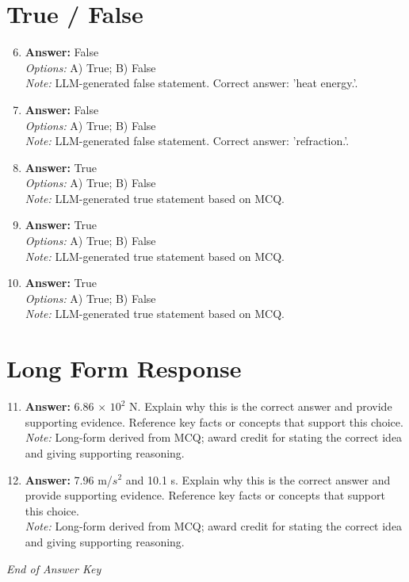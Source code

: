 \documentclass[12pt]{article}
\begin{document}
\section*{True / False}
\begin{enumerate}[label=\arabic*.]
\setcounter{enumi}{5}
\item \textbf{Answer:} False
\\ \textit{Options:} A) True; B) False
\\ \textit{Note:} LLM-generated false statement. Correct answer: 'heat energy.'.
\item \textbf{Answer:} False
\\ \textit{Options:} A) True; B) False
\\ \textit{Note:} LLM-generated false statement. Correct answer: 'refraction.'.
\item \textbf{Answer:} True
\\ \textit{Options:} A) True; B) False
\\ \textit{Note:} LLM-generated true statement based on MCQ.
\item \textbf{Answer:} True
\\ \textit{Options:} A) True; B) False
\\ \textit{Note:} LLM-generated true statement based on MCQ.
\item \textbf{Answer:} True
\\ \textit{Options:} A) True; B) False
\\ \textit{Note:} LLM-generated true statement based on MCQ.
\end{enumerate}

\section*{Long Form Response}
\begin{enumerate}[label=\arabic*.]
\setcounter{enumi}{10}
\item \textbf{Answer:} 6.86 \ensuremath{\times} $10^2$ N. Explain why this is the correct answer and provide supporting evidence. Reference key facts or concepts that support this choice.
\\ \textit{Note:} Long-form derived from MCQ; award credit for stating the correct idea and giving supporting reasoning.
\item \textbf{Answer:} 7.96 m/$s^2$ and 10.1 s. Explain why this is the correct answer and provide supporting evidence. Reference key facts or concepts that support this choice.
\\ \textit{Note:} Long-form derived from MCQ; award credit for stating the correct idea and giving supporting reasoning.
\end{enumerate}

\vfill
\noindent\textit{End of Answer Key}
\end{document}
